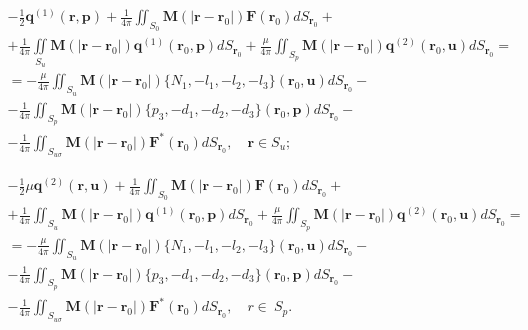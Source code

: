 \begin{multline}
 -\frac{1}{2}\boldsymbol{q}^{(1)}(\boldsymbol r, \boldsymbol p)+
 \frac{1}{4\pi}\iint_{ S_{0}}  \boldsymbol M(|\boldsymbol{r}-\boldsymbol{r}_{0}|)\boldsymbol{F}(\boldsymbol{r}_{0})dS_{\boldsymbol r_{0}}+\\
 + \frac{1}{4\pi}\iint\limits_{ S_{u}}  \boldsymbol M(|\boldsymbol{r}-\boldsymbol{r}_{0}|)\boldsymbol{q}^{(1)}(\boldsymbol{r}_{0},\boldsymbol p)  dS_{\boldsymbol r_{0}}  
 + 
 \frac{\mu}{4\pi}\iint_{ S_{p}}  \boldsymbol M(|\boldsymbol{r}-\boldsymbol{r}_{0}|)
 \boldsymbol{q}^{(2)}(\boldsymbol{r}_{0},\boldsymbol u)  dS_{\boldsymbol r_{0}}=\\
= -
  \frac{\mu}{4\pi}\iint_{ S_{u}}  \boldsymbol M(|\boldsymbol{r}-\boldsymbol{r}_{0}|)\{N_{1}, -l_{1}, -l_{2}, -l_{3}\}(\boldsymbol{r}_{0},\boldsymbol u)  dS_{\boldsymbol r_{0}} - \\
-\frac{1}{4\pi}\iint_{ S_{p}} \boldsymbol M(|\boldsymbol{r}-\boldsymbol{r}_{0}|)
  \{p_{3}, -d_{1}, -d_{2}, -d_{3}\}(\boldsymbol{r}_{0},\boldsymbol p)  dS_{\boldsymbol r_{0}}- \\
-
 \frac{1}{4\pi}\iint_{ S_{u\sigma}}  \boldsymbol M(|\boldsymbol{r}-\boldsymbol{r}_{0}|)\boldsymbol{F}^{*}
 (\boldsymbol{r}_{0})dS_{\boldsymbol r_{0}},\quad \boldsymbol  r\in S_{u};
 \end{multline}

\begin{multline}
-\frac{1}{2}\mu\boldsymbol{q}^{(2)}(\boldsymbol r, \boldsymbol u )+
\frac{1}{4\pi}\iint_{ S_{0}}  \boldsymbol M(|\boldsymbol{r}-\boldsymbol{r}_{0}|)\boldsymbol{F}(\boldsymbol{r}_{0})dS_{\boldsymbol r_{0}}+\\
+ \frac{1}{4\pi}\iint_{ S_{u}}  \boldsymbol M(|\boldsymbol{r}-\boldsymbol{r}_{0}|)\boldsymbol{q}^{(1)}(\boldsymbol{r}_{0},\boldsymbol p)  dS_{\boldsymbol r_{0}}  
  +    \frac{\mu}{4\pi}\iint_{ S_{p}}  \boldsymbol M(|\boldsymbol{r}-\boldsymbol{r}_{0}|)\boldsymbol{q}^{(2)}(\boldsymbol{r}_{0},\boldsymbol u)  dS_{\boldsymbol r_{0}} =\\
= -
  \frac{\mu}{4\pi}\iint_{ S_{u}}  \boldsymbol M(|\boldsymbol{r}-\boldsymbol{r}_{0}|)\{N_{1}, -l_{1}, -l_{2}, -l_{3}\}(\boldsymbol{r}_{0},\boldsymbol u)  dS_{\boldsymbol r_{0}} -\\
-\frac{1}{4\pi}\iint_{ S_{p}} \boldsymbol M(|\boldsymbol{r}-\boldsymbol{r}_{0}|)  \{p_{3}, -d_{1}, -d_{2}, -d_{3}\}(\boldsymbol{r}_{0},\boldsymbol p)  dS_{\boldsymbol r_{0}}- \\
-
 \frac{1}{4\pi}\iint_{ S_{u\sigma}}  \boldsymbol M(|\boldsymbol{r}-\boldsymbol{r}_{0}|)\boldsymbol{F}^{*}
 (\boldsymbol{r}_{0})dS_{\boldsymbol r_{0}}, \quad  r\in\ S_{p}.
\end{multline} 

